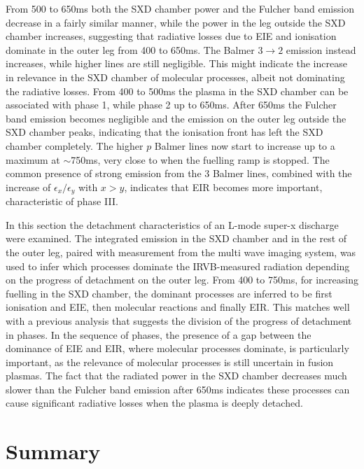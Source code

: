 From 500 to 650ms both the SXD chamber power and the Fulcher band emission decrease in a fairly similar manner, while the power in the leg outside the SXD chamber increases, suggesting that radiative losses due to EIE and ionisation dominate in the outer leg from 400 to 650ms. The Balmer $3 \rightarrow 2$ emission instead increases, while higher lines are still negligible. This might indicate the increase in relevance in the SXD chamber of molecular processes, albeit not dominating the radiative losses. From 400 to 500ms the plasma in the SXD chamber can be associated with phase 1, while phase 2 up to 650ms. After 650ms the Fulcher band emission becomes negligible and the emission on the outer leg outside the SXD chamber peaks, indicating that the ionisation front has left the SXD chamber completely. The higher $p$ Balmer lines now start to increase up to a maximum at $\sim$750ms, very close to when the fuelling ramp is stopped. The common presence of strong emission from the 3 Balmer lines, combined with the increase of $\epsilon_x / \epsilon_y$ with $x>y$, indicates that EIR becomes more important, characteristic of phase III.%

In this section the detachment characteristics of an L-mode super-x discharge were examined. The integrated emission in the SXD chamber and in the rest of the outer leg, paired with measurement from the multi wave imaging system, was used to infer which processes dominate the IRVB-measured radiation depending on the progress of detachment on the outer leg. From 400 to 750ms, for increasing fuelling in the SXD chamber, the dominant processes are inferred to be first ionisation and EIE, then molecular reactions and finally EIR. This matches well with a previous analysis that suggests the division of the progress of detachment in phases.\cite{Verhaegh2022} In the sequence of phases, the presence of a gap between the dominance of EIE and EIR, where molecular processes dominate, is particularly important, as the relevance of molecular processes is still uncertain in fusion plasmas. The fact that the radiated power in the SXD chamber decreases much slower than the Fulcher band emission after 650ms indicates these processes can cause significant radiative losses when the plasma is deeply detached.



\section{Summary}\label{Summary IRVB science}


